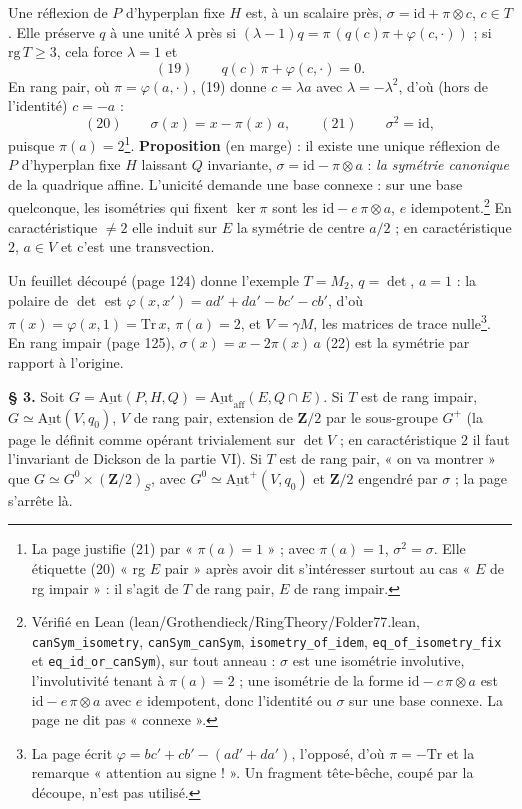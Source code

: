 \documentclass[11pt,a4paper]{article}
\begin{document}
Une réflexion de $P$ d'hyperplan fixe $H$ est, à un scalaire près, $\sigma = \mathrm{id} +
\pi \otimes c$, $c \in T$. Elle préserve $q$ à une unité $\lambda$ près si $(\lambda -
1)q = \pi\,(q(c)\pi + \varphi(c, \cdot))$ ; si $\mathrm{rg}\,T \geq 3$, cela force
$\lambda = 1$ et
\[
  (19) \qquad q(c)\,\pi + \varphi(c, \cdot) = 0 .
\]
En rang pair, où $\pi = \varphi(a, \cdot)$, (19) donne $c = \lambda a$ avec $\lambda
= -\lambda^2$, d'où (hors de l'identité) $c = -a$ :
\[
  (20) \qquad \sigma(x) = x - \pi(x)\, a, \qquad (21) \qquad \sigma^2 = \mathrm{id},
\]
puisque $\pi(a) = 2$\footnote{La page justifie (21) par « $\pi(a) = 1$ » ; avec $\pi(a)
= 1$, $\sigma^2 = \sigma$. Elle étiquette (20) « rg $E$ pair » après avoir dit
s'intéresser surtout au cas « $E$ de rg impair » : il s'agit de $T$ de rang pair, $E$
de rang impair.}. \textbf{Proposition} (en marge) : il existe une unique réflexion de
$P$ d'hyperplan fixe $H$ laissant $Q$ invariante, $\sigma = \mathrm{id} - \pi \otimes a$ :
\emph{la symétrie canonique} de la quadrique affine. L'unicité demande une base
connexe : sur une base quelconque, les isométries qui fixent $\ker \pi$ sont les
$\mathrm{id} - e\,\pi \otimes a$, $e$ idempotent.\footnote{Vérifié en Lean
(lean/Grothendieck/RingTheory/Folder77.lean, \texttt{canSym\_isometry},
\texttt{canSym\_canSym}, \texttt{isometry\_of\_idem}, \texttt{eq\_of\_isometry\_fix}
et \texttt{eq\_id\_or\_canSym}), sur tout anneau : $\sigma$ est une isométrie
involutive, l'involutivité tenant à $\pi(a) = 2$ ; une isométrie de la forme
$\mathrm{id} - c\,\pi \otimes a$ est $\mathrm{id} - e\,\pi \otimes a$ avec $e$
idempotent, donc l'identité ou $\sigma$ sur une base connexe. La page ne dit
pas « connexe ».} En caractéristique $\neq 2$ elle
induit sur $E$ la symétrie de centre $a/2$ ; en caractéristique $2$, $a \in V$ et c'est
une transvection.

Un feuillet découpé (page 124) donne l'exemple $T = M_2$, $q = \det$, $a = 1$ : la
polaire de $\det$ est $\varphi(x, x') = ad' + da' - bc' - cb'$, d'où $\pi(x) = \varphi(x,
1) = \mathrm{Tr}\,x$, $\pi(a) = 2$, et $V = \gamma M$, les matrices de trace
nulle\footnote{La page écrit $\varphi = bc' + cb' - (ad' + da')$, l'opposé, d'où $\pi =
-\mathrm{Tr}$ et la remarque « attention au signe ! ». Un fragment tête-bêche, coupé
par la découpe, n'est pas utilisé.}. En rang impair (page 125), $\sigma(x) = x -
2\pi(x)\,a$ (22) est la symétrie par rapport à l'origine.

\textbf{§ 3.} Soit $G = \underline{\mathrm{Aut}}(P, H, Q) =
\underline{\mathrm{Aut}}_{\mathrm{aff}}(E, Q \cap E)$. Si $T$ est de rang impair, $G
\simeq \underline{\mathrm{Aut}}(V, q_0)$, $V$ de rang pair, extension de $\mathbf{Z}/2$
par le sous-groupe $G^{+}$ (la page le définit comme opérant trivialement sur $\det V$
; en caractéristique $2$ il faut l'invariant de Dickson de la partie VI). Si $T$ est de
rang pair, « on va montrer » que $G \simeq G^0 \times (\mathbf{Z}/2)_S$, avec $G^0
\simeq \underline{\mathrm{Aut}}^{+}(V, q_0)$ et $\mathbf{Z}/2$ engendré par $\sigma$ ; la
page s'arrête là.
\end{document}
